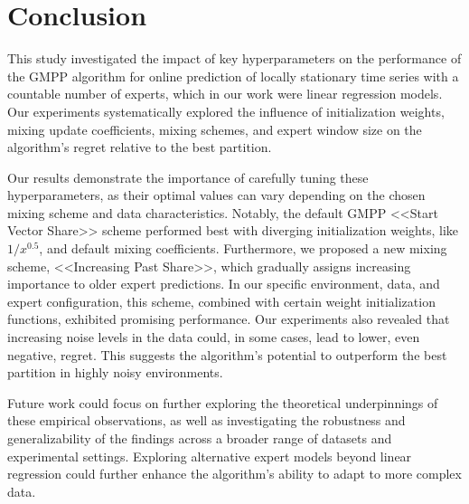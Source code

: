 \documentclass[12pt, twoside]{article}
\begin{document}
\section{Conclusion}

This study investigated the impact of key hyperparameters on the performance of the GMPP algorithm for online prediction of locally stationary time series with a countable number of experts, which in our work were linear regression models. Our experiments systematically explored the influence of initialization weights, mixing update coefficients, mixing schemes, and expert window size on the algorithm's regret relative to the best partition.

Our results demonstrate the importance of carefully tuning these hyperparameters, 
as their optimal values can vary depending on the chosen mixing scheme and data characteristics. 
Notably, the default GMPP <<Start Vector Share>> scheme performed best with diverging initialization weights, like $1/x^{0.5}$, and default mixing coefficients. 
Furthermore, we proposed a new mixing scheme, <<Increasing Past Share>>, which gradually assigns increasing importance to older expert predictions. 
In our specific environment, data, and expert configuration, this scheme, combined with certain weight initialization functions, exhibited promising performance. 
Our experiments also revealed that increasing noise levels in the data could, in some cases, lead to lower, even negative, regret. 
This suggests the algorithm's potential to outperform the best partition in highly noisy environments.

Future work could focus on further exploring the theoretical underpinnings of these empirical observations, 
as well as investigating the robustness and generalizability of the findings across a broader range of datasets and experimental settings. 
Exploring alternative expert models beyond linear regression could further enhance the algorithm's ability to adapt to more complex data.

\end{document}
